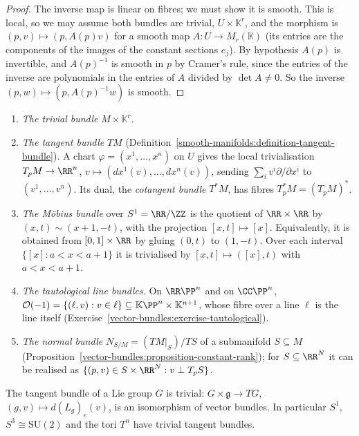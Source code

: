 \begin{proof}
The inverse map is linear on fibres; we must show it is smooth. This is local, so we may assume both bundles are trivial, $U \times \mathbb{K}^r$, and the morphism is
$(p, v) \mapsto (p, A(p)v)$ for a smooth map $A \colon U \to M_r(\mathbb{K})$ (its entries are the components of the images of the constant sections $e_j$). By hypothesis $A(p)$ is
invertible, and $A(p)^{-1}$ is smooth in $p$ by Cramer's rule, since the entries of the inverse are polynomials in the entries of $A$ divided by $\det A \neq 0$. So the inverse
$(p, w) \mapsto (p, A(p)^{-1}w)$ is smooth.
\end{proof}

\begin{example}\label{vector-bundles:example-bundles}
\begin{enumerate}
\item \emph{The trivial bundle} $M \times \mathbb{K}^r$.
\item \emph{The tangent bundle} $TM$ (Definition~\ref{smooth-manifolds:definition-tangent-bundle}). A chart $\varphi = (x^1, \ldots, x^n)$ on $U$ gives the local trivialisation
$T_pM \to \RR^n$, $v \mapsto (dx^1(v), \ldots, dx^n(v))$, sending $\sum_iv^i\partial/\partial x^i$ to $(v^1, \ldots, v^n)$. Its dual, the \emph{cotangent bundle} $T^*M$, has fibres
$T_p^*M = (T_pM)^*$.
\item \emph{The M\"obius bundle} over $S^1 = \RR/\ZZ$ is the quotient of $\RR \times \RR$ by $(x, t) \sim (x + 1, -t)$, with the projection $[x, t] \mapsto [x]$. Equivalently,
it is obtained from $[0, 1] \times \RR$ by gluing $(0, t)$ to $(1, -t)$. Over each interval $\{[x] : a < x < a + 1\}$ it is trivialised by $[x, t] \mapsto ([x], t)$ with
$a < x < a + 1$.
\item \emph{The tautological line bundles.} On $\RR\PP^n$ and on $\CC\PP^n$, $\mathcal{O}(-1) = \{(\ell, v) : v \in \ell\} \subseteq \mathbb{K}\PP^n \times \mathbb{K}^{n+1}$, whose fibre over a
line $\ell$ is the line itself (Exercise~\ref{vector-bundles:exercise-tautological}).
\item \emph{The normal bundle} $N_{S/M} = (TM|_S)/TS$ of a submanifold $S \subseteq M$ (Proposition~\ref{vector-bundles:proposition-constant-rank}); for $S \subseteq \RR^N$ it can be
realised as $\{(p, v) \in S \times \RR^N : v \perp T_pS\}$.
\end{enumerate}
\end{example}

\begin{proposition}\label{vector-bundles:proposition-lie-group-parallelisable}
The tangent bundle of a Lie group $G$ is trivial: $G \times \mathfrak{g} \to TG$, $(g, v) \mapsto d(L_g)_e(v)$, is an isomorphism of vector bundles. In particular $S^1$, $S^3 \cong \mathrm{SU}(2)$ and the tori $T^n$ have trivial tangent
bundles.
\end{proposition}

